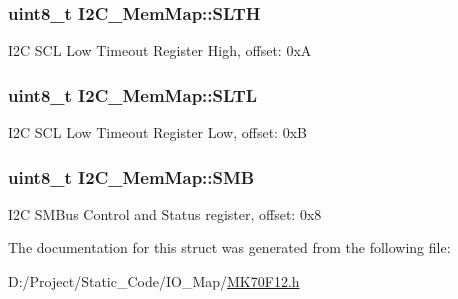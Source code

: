 \subsubsection[{S\+L\+T\+H}]{\setlength{\rightskip}{0pt plus 5cm}uint8\+\_\+t I2\+C\+\_\+\+Mem\+Map\+::\+S\+L\+T\+H}\label{struct_i2_c___mem_map_aac56d4be80ad622d7bf85bdd8c29504c}
I2\+C S\+C\+L Low Timeout Register High, offset\+: 0x\+A \hypertarget{struct_i2_c___mem_map_afd5aa3cef3245893addeb55556e1ceff}{}
\subsubsection[{S\+L\+T\+L}]{\setlength{\rightskip}{0pt plus 5cm}uint8\+\_\+t I2\+C\+\_\+\+Mem\+Map\+::\+S\+L\+T\+L}\label{struct_i2_c___mem_map_afd5aa3cef3245893addeb55556e1ceff}
I2\+C S\+C\+L Low Timeout Register Low, offset\+: 0x\+B \hypertarget{struct_i2_c___mem_map_a14ca29af4960a6588080acb71f62d5fa}{}
\subsubsection[{S\+M\+B}]{\setlength{\rightskip}{0pt plus 5cm}uint8\+\_\+t I2\+C\+\_\+\+Mem\+Map\+::\+S\+M\+B}\label{struct_i2_c___mem_map_a14ca29af4960a6588080acb71f62d5fa}
I2\+C S\+M\+Bus Control and Status register, offset\+: 0x8 

The documentation for this struct was generated from the following file\+:\begin{DoxyCompactItemize}
\item 
D\+:/\+Project/\+Static\+\_\+\+Code/\+I\+O\+\_\+\+Map/\hyperlink{_m_k70_f12_8h}{M\+K70\+F12.\+h}\end{DoxyCompactItemize}
